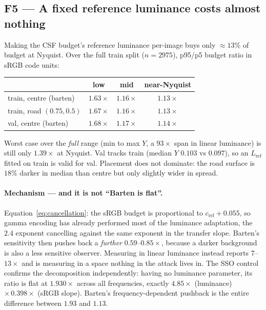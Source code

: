 \documentclass[11pt,a4paper]{article}
\begin{document}
\subsection{F5 --- A fixed reference luminance costs almost nothing}

Making the CSF budget's reference luminance per-image buys only
$\approx13\%$ of budget at Nyquist. Over the full train split ($n=2975$),
p95/p5 budget ratio in sRGB code units:
\begin{center}
\begin{tabular}{@{}lccc@{}}
\toprule
 & low & mid & near-Nyquist \\
\midrule
train, centre (barten) & $1.63\times$ & $1.16\times$ & $1.13\times$ \\
train, road $(0.75,0.5)$ & $1.67\times$ & $1.16\times$ & $1.13\times$ \\
val, centre (barten) & $1.68\times$ & $1.17\times$ & $1.14\times$ \\
\bottomrule
\end{tabular}
\end{center}
Worst case over the \emph{full} range (min to max $Y$, a $93\times$ span in
linear luminance) is still only $1.39\times$ at Nyquist. Val tracks train
(median $Y$ $0.103$ vs $0.097$), so an $L_{\mathrm{ref}}$ fitted on train is
valid for val. Placement does not dominate: the road surface is $18\%$
darker in median than centre but only slightly wider in spread.

\paragraph{Mechanism --- and it is not ``Barten is flat''.}
Equation~\eqref{eq:cancellation}: the sRGB budget is proportional to
$c_{\mathrm{ref}}+0.055$, so gamma encoding has already performed most of
the luminance adaptation, the $2.4$ exponent cancelling against the same
exponent in the transfer slope. Barten's sensitivity then pushes back a
\emph{further} $0.59$--$0.85\times$, because a darker background is also a
less sensitive observer. Measuring in linear luminance instead reports
$7$--$13\times$ and is measuring in a space nothing in the attack lives in.
The SSO control confirms the decomposition independently: having no
luminance parameter, its ratio is flat at $1.930\times$ across all
frequencies, exactly $4.85\times$ (luminance) $\times\,0.398\times$ (sRGB
slope). Barten's frequency-dependent pushback is the entire difference
between $1.93$ and $1.13$.
\end{document}
